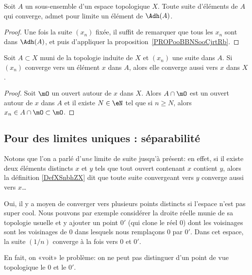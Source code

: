 \begin{corollary}\label{CorLimAbarA}
	Soit \( A \) un sous-ensemble d'un espace topologique \( X\). Toute suite d'éléments de \( A\) qui converge, admet pour limite un élément de \( \Adh(A) \).
\end{corollary}
\begin{proof}
	Une fois la suite \( (x_n) \) fixée, il suffit de remarquer que tous les \( x_n \) sont dans \( \Adh(A) \), et puis d'appliquer la proposition~\ref{PROPooBBNSooCjrtRb}.
\end{proof}


\begin{lemma}   \label{LemPESaiVw}
	Soit \( A\subset X\) muni de la topologie induite de \( X\) et \( (x_n)\) une suite dans \( A\). Si \( (x_n) \) converge vers un élément \( x \) dans \(A \), alors elle converge aussi vers \(x \) dans \( X \).
\end{lemma}

\begin{proof}
	Soit \( \mO\) un ouvert autour de \( x\) dans \( X\). Alors \( A\cap\mO\) est un ouvert autour de \( x\) dans \( A\) et il existe \( N\in \eN\) tel que si \( n\geq N\), alors \( x_n\in A\cap\mO\subset\mO\).
\end{proof}

\subsection{Pour des limites uniques : séparabilité}

Notons que l'on a parlé d'\emph{une} limite de suite jusqu'à présent: en effet, si il existe deux éléments distincts \( x\) et \( y\) tels que tout ouvert contenant \( x\) contient \( y\), alors la définition \ref{DefXSnbhZX} dit que toute suite convergeant vers \( y\) converge aussi vers \( x\)\dots


\begin{example} \label{EXooSHKAooZQEVLB}
	Oui, il y a moyen de converger vers plusieurs points distincts si l'espace n'est pas super cool. Nous pouvons par exemple \cite{EJVQuas} considérer la droite réelle munie de sa topologie usuelle et y ajouter un point \( 0'\) (qui clone le réel \( 0\)) dont les voisinages sont les voisinages de \( 0\) dans lesquels nous remplaçons \( 0\) par \( 0'\). Dans cet espace, la suite \( (1/n)\) converge à la fois vers \( 0\) et \( 0'\).

	En fait, on «voit» le problème: on ne peut pas distinguer d'un point de vue topologique le \( 0\) et le \( 0'\).
\end{example}


